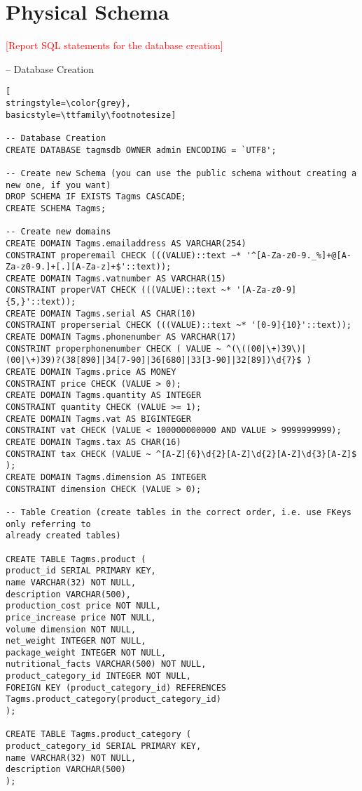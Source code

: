\section{Physical Schema}
\textcolor{red}{[Report SQL statements for the database creation]}

-- Database Creation
\begin{lstlisting}[
stringstyle=\color{grey},
basicstyle=\ttfamily\footnotesize]

-- Database Creation
CREATE DATABASE tagmsdb OWNER admin ENCODING = `UTF8';

-- Create new Schema (you can use the public schema without creating a new one, if you want)
DROP SCHEMA IF EXISTS Tagms CASCADE;
CREATE SCHEMA Tagms;

-- Create new domains
CREATE DOMAIN Tagms.emailaddress AS VARCHAR(254)
CONSTRAINT properemail CHECK (((VALUE)::text ~* '^[A-Za-z0-9._%]+@[A-Za-z0-9.]+[.][A-Za-z]+$'::text));
CREATE DOMAIN Tagms.vatnumber AS VARCHAR(15)
CONSTRAINT properVAT CHECK (((VALUE)::text ~* '[A-Za-z0-9]{5,}'::text));
CREATE DOMAIN Tagms.serial AS CHAR(10)
CONSTRAINT properserial CHECK (((VALUE)::text ~* '[0-9]{10}'::text));
CREATE DOMAIN Tagms.phonenumber AS VARCHAR(17)
CONSTRINT properphonenumber CHECK ( VALUE ~ ^(\((00|\+)39\)|(00|\+)39)?(38[890]|34[7-90]|36[680]|33[3-90]|32[89])\d{7}$ )
CREATE DOMAIN Tagms.price AS MONEY
CONSTRAINT price CHECK (VALUE > 0);
CREATE DOMAIN Tagms.quantity AS INTEGER
CONSTRAINT quantity CHECK (VALUE >= 1);
CREATE DOMAIN Tagms.vat AS BIGINTEGER
CONSTRAINT vat CHECK (VALUE < 100000000000 AND VALUE > 9999999999);
CREATE DOMAIN Tagms.tax AS CHAR(16)
CONSTRAINT tax CHECK (VALUE ~ ^[A-Z]{6}\d{2}[A-Z]\d{2}[A-Z]\d{3}[A-Z]$ );
CREATE DOMAIN Tagms.dimension AS INTEGER
CONSTRAINT dimension CHECK (VALUE > 0);

-- Table Creation (create tables in the correct order, i.e. use FKeys only referring to
already created tables)

CREATE TABLE Tagms.product (
product_id SERIAL PRIMARY KEY,
name VARCHAR(32) NOT NULL,
description VARCHAR(500),
production_cost price NOT NULL,
price_increase price NOT NULL,
volume dimension NOT NULL,
net_weight INTEGER NOT NULL,
package_weight INTEGER NOT NULL,
nutritional_facts VARCHAR(500) NOT NULL,
product_category_id INTEGER NOT NULL,
FOREIGN KEY (product_category_id) REFERENCES Tagms.product_category(product_category_id)
);

CREATE TABLE Tagms.product_category (
product_category_id SERIAL PRIMARY KEY,
name VARCHAR(32) NOT NULL,
description VARCHAR(500)
);


\end{lstlisting}
